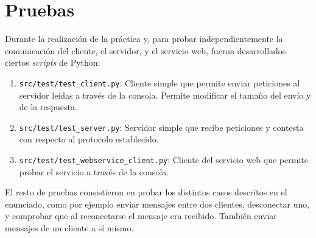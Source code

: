 \section{Pruebas}

Durante la realización de la práctica y, para probar independientemente la comunicación del cliente, el servidor, y el servicio web, fueron desarrollados ciertos \textit{scripts} de Python:
\begin{enumerate}
    \item \texttt{src/test/test\_client.py}: Cliente simple que permite enviar peticiones al servidor leídas a través de la consola. Permite modificar el tamaño del envío y de la respuesta.
    \item \texttt{src/test/test\_server.py}: Servidor simple que recibe peticiones y contesta con respecto al protocolo establecido.
    \item \texttt{src/test/test\_webservice\_client.py}: Cliente del servicio web que permite probar el servicio a través de la consola.
\end{enumerate}

El resto de pruebas consistieron en probar los distintos casos descritos en el enunciado, como por ejemplo enviar mensajes entre dos clientes, desconectar uno, y comprobar que al reconectarse el mensaje era recibido. También enviar mensajes de un cliente a sí mismo.